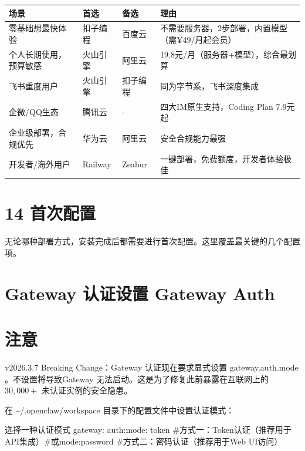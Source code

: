 \documentclass[
  10
]{article}
\newenvironment{Shaded}{}{}
\newcommand{\NormalTok}[1]{#1}
\newcounter{none} %
\begin{document}
{\def\LTcaptype{none} %
\begin{longtable}[]{@{}|l|l|l|l|@{}}
\toprule\noalign{}
\endhead
\bottomrule\noalign{}
\endlastfoot
\hline
场景 & 首选 & 备选 & 理由 \\
\hline
零基础想最快体验 & 扣子编程 & 百度云 &
不需要服务器，2步部署，内置模型（需¥49/月起会员） \\
\hline
个人长期使用，预算敏感 & 火山引擎 & 阿里云 &
19.8元/月（服务器+模型），综合最划算 \\
\hline
飞书重度用户 & 火山引擎 & 扣子编程 & 同为字节系，飞书深度集成 \\
\hline
企微/QQ生态 & 腾讯云 & - & 四大IM原生支持，Coding Plan 7.9元起 \\
\hline
企业级部署，合规优先 & 华为云 & 阿里云 & 安全合规能力最强 \\
\hline
开发者/海外用户 & Railway & Zeabur &
一键部署，免费额度，开发者体验极佳 \\
\hline
\end{longtable}
}

\section{14 首次配置}\label{ux9996ux6b21ux914dux7f6e}

无论哪种部署方式，安装完成后都需要进行首次配置。这里覆盖最关键的几个配置项。

\section{Gateway 认证设置 Gateway
Auth}\label{gateway-ux8ba4ux8bc1ux8bbeux7f6e-gateway-auth}

\section{注意}\label{ux6ce8ux610f-5}

v2026.3.7 Breaking Change：Gateway 认证现在要求显式设置
gateway.auth.mode 。不设置将导致Gateway
无法启动。这是为了修复此前暴露在互联网上的 \({ 3 0 , 0 0 0 + }\)
未认证实例的安全隐患。

在 \textasciitilde/.openclaw/workspace 目录下的配置文件中设置认证模式：

\begin{Shaded}
\begin{Highlighting}[]
\NormalTok{选择一种认证模式  }
\NormalTok{gateway:  }
\NormalTok{auth:mode: token \#方式一：Token认证（推荐用于API集成）\#或mode:password \#方式二：密码认证（推荐用于Web UI访问）}
\end{Highlighting}
\end{Shaded}
\end{document}
